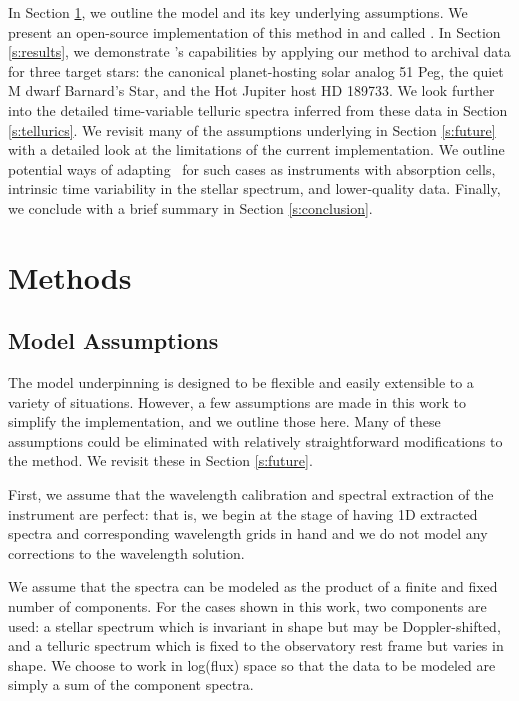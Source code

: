 \documentclass[modern]{aastex62}
\newcommand{\Mdwarf}{Barnard's Star\xspace} %
\begin{document}
In Section \ref{s:methods}, we outline the model and its key underlying assumptions. 
We present an open-source implementation of this method in \python and \TF
\citep{Abadi15} called \wobble.
In Section \ref{s:results}, we demonstrate \wobble's capabilities by applying our method to \HARPS archival data for three target stars: the canonical planet-hosting solar analog 51 Peg, the quiet M dwarf \Mdwarf, and the Hot Jupiter host HD 189733. 
We look further into the detailed time-variable telluric spectra inferred from these data in Section \ref{s:tellurics}.
We revisit many of the assumptions underlying \wobble in Section \ref{s:future} with a detailed look at the limitations of the current implementation. 
We outline potential ways of adapting \wobble\ for such cases as instruments with absorption cells, intrinsic time variability in the stellar spectrum, and lower-quality data. 
Finally, we conclude with a brief summary in Section \ref{s:conclusion}.

\section{Methods}
\label{s:methods}
\subsection{Model Assumptions}
\label{s:assumptions}

The model underpinning \wobble is designed to be flexible and easily extensible to a variety of situations. 
However, a few assumptions are made in this work to simplify the implementation, and we outline those here. 
Many of these assumptions could be eliminated with relatively straightforward modifications to the method. 
We revisit these in Section \ref{s:future}.

First, we assume that the wavelength calibration and spectral extraction of the instrument are perfect: that is, we begin at the stage of having 1D extracted spectra and corresponding wavelength grids in hand and we do not model any corrections to the wavelength solution.

We assume that the spectra can be modeled as the product of a finite and fixed number of components.
For the cases shown in this work, two components are used: a stellar spectrum which is invariant in shape but may be Doppler-shifted, and a telluric spectrum which is fixed to the observatory rest frame but varies in shape. 
We choose to work in log(flux) space so that the data to be modeled are simply a sum of the component spectra.
\end{document}
